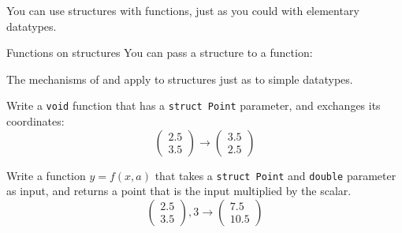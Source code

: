 You can use structures with functions, just as you could with
elementary datatypes.

\begin{block}{Functions on structures}
  \label{sl:struct-pass}
  You can pass a structure to a function:

  \footnotesize
\end{block}


The mechanisms of  and
 apply to structures just as
to simple datatypes.

\begin{exercise}
  \label{ex:vecstruct-flip}
  Write a \lstinline$void$ function that has a \lstinline$struct Point$ parameter,
  and exchanges its coordinates:
  \[ \begin{pmatrix}2.5\\3.5\end{pmatrix} \rightarrow
    \begin{pmatrix}3.5\\2.5\end{pmatrix} \]
\end{exercise}

\begin{exercise}
  \label{ex:vecstruct-scale}
  Write a function $y=f(x,a)$ that takes a \lstinline$struct Point$ and
  \lstinline$double$ parameter as input, and returns a point that is the
  input multiplied by the scalar.
  \[ \begin{pmatrix}2.5\\3.5\end{pmatrix},3 \rightarrow
    \begin{pmatrix}7.5\\10.5\end{pmatrix} \]
\end{exercise}

